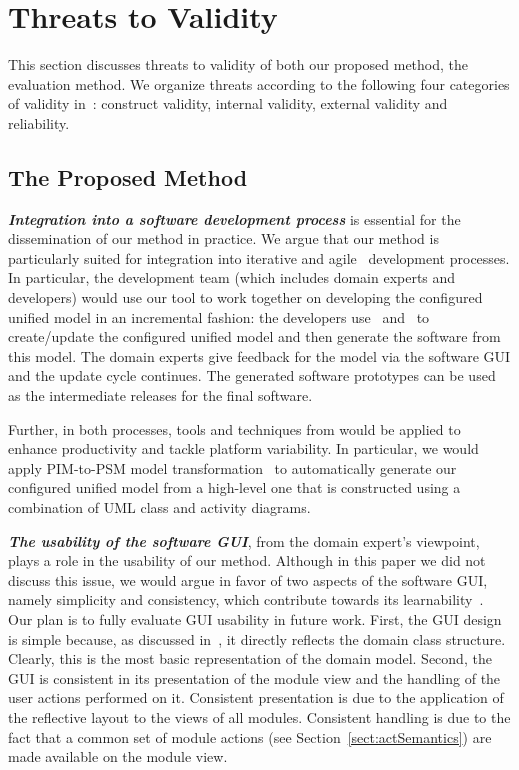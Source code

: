 \section{Threats to Validity} \label{sect:threats}
This section discusses threats to validity of both our proposed method, the evaluation method. We organize threats according to the following four categories of validity in~\cite{runeson2009guidelines}: construct validity, internal validity, external validity and reliability.

\subsection{The Proposed Method}

\textbf{\textit{Integration into a software development process}} is essential for the dissemination of our method in practice. We argue that our method is particularly suited for integration into iterative \cite{larman_applying_2004} and agile~\cite{beck_manifesto_2017} development processes. In particular, the development team (which includes domain experts and developers) would use our tool to work together on developing the configured unified model in an incremental fashion: the developers use \dcsl~and \agl~to create/update the configured unified model and then generate the software from this model. The domain experts give feedback for the model via the software GUI and the update cycle continues. The generated software prototypes can be used as the intermediate releases for the final software.

Further, in both processes, tools and techniques from  would be applied to enhance productivity and tackle platform variability. In particular, we would apply PIM-to-PSM model transformation~\cite{kent_model_2002,brambilla_model-driven_2012} to automatically generate our configured unified model from a high-level one that is constructed using a combination of UML class and activity diagrams.

\textbf{\textit{The usability of the software GUI}}, from the domain expert's viewpoint, plays a role in the usability of our method. Although in this paper we did not discuss this issue, we would argue in favor of two aspects of the software GUI, namely simplicity and consistency, which contribute towards its learnability~\cite{folmer_architecting_2004}. Our plan is to fully evaluate GUI usability in future work. First, the GUI design is simple because, as discussed in~\cite{le_domain_2018}, it directly reflects the domain class structure. Clearly, this is the most basic representation of the domain model. Second, the GUI is consistent in its presentation of the module view and the handling of the user actions performed on it. Consistent presentation is due to the application of the reflective layout to the views of all modules. Consistent handling is due to the fact that a common set of module actions (see Section~\ref{sect:actSemantics}) are made available on the module view.

